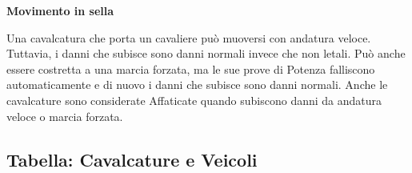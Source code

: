 \documentclass[a4paper,11pt,twoside,openany]{book}
\begin{document}
\textbf{Movimento in sella}

Una cavalcatura che porta un cavaliere può muoversi con andatura veloce. Tuttavia, i danni che subisce sono danni normali invece che non letali. Può anche essere costretta a una marcia forzata, ma le sue prove di Potenza falliscono automaticamente e di nuovo i danni che subisce sono danni normali. Anche le cavalcature sono considerate Affaticate quando subiscono danni da andatura veloce o marcia forzata.

\subsection{Tabella: Cavalcature e Veicoli}

\medskip

\label{tabella-cavalcature-e-veicoli}
\end{document}
